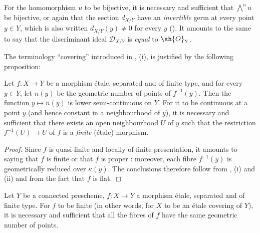 For the homomorphism $u$ to be bijective, it is necessary and sufficient that $\bigwedge^n u$ be bijective, or again that the section $d_{X/Y}$ have an \emph{invertible} germ at every point $y\in Y$, which is also written $d_{X/Y}(y)\neq 0$ for every $y$ ().
It amounts to the same to say that the discriminant ideal $\mathscr{D}_{X/Y}$ is \emph{equal} to $\sh{O}_Y$.

The terminology ``covering'' introduced in , (i), is justified by the following proposition:

\begin{proposition}[18.2.8]
\label{IV.18.2.8}
Let $f:X\to Y$ be a morphism \'etale, separated and of finite type, and for every $y\in Y$, let $n(y)$ be the geometric number of points of $f^{-1}(y)$.
Then the function $y\mapsto n(y)$ is lower semi-continuous on $Y$.
For it to be continuous at a point $y$ (and hence constant in a neighbourhood of $y$), it is necessary and sufficient that there exists an open neighbourhood $U$ of $y$ such that the restriction $f^{-1}(U)\to U$ of $f$ is a \emph{finite} (\'etale) morphism.
\end{proposition}

\begin{proof}
Since $f$ is quasi-finite  and locally of finite presentation, it amounts to saying that $f$ is finite or that $f$ is proper :
moreover, each fibre $f^{-1}(y)$ is geometrically reduced over $\kappa(y)$.
The conclusions therefore follow from , (i) and (ii) and from the fact that $f$ is flat.
\end{proof}

\begin{corollary}[18.2.9]
\label{IV.18.2.9}
Let $Y$ be a connected prescheme, $f:X\to Y$ a morphism \'etale, separated and of finite type.
For $f$ to be finite (in other words, for $X$ to be an \'etale covering of $Y$), it is necessary and sufficient that all the fibres of $f$ have the same geometric number of points.
\end{corollary}

